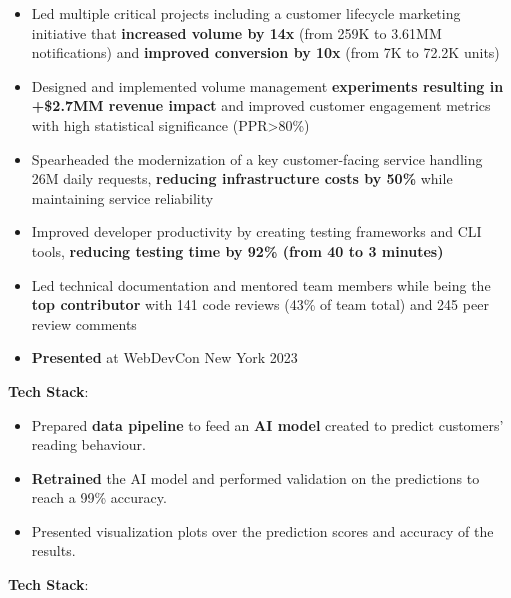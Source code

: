 \documentclass[10pt,a4paper,ragged2e]{altacv}
\begin{document}
\begin{itemize}
  \item Led multiple critical projects including a customer lifecycle marketing initiative that \textbf{increased volume by 14x} (from 259K to 3.61MM notifications) and \textbf{improved conversion by 10x} (from 7K to 72.2K units)
  \item Designed and implemented volume management \textbf{experiments resulting in +\$2.7MM revenue impact} and improved customer engagement metrics with high statistical significance (PPR>80\%)
  \item Spearheaded the modernization of a key customer-facing service handling 26M daily requests, \textbf{reducing infrastructure costs by 50\%} while maintaining service reliability
  \item Improved developer productivity by creating testing frameworks and CLI tools, \textbf{reducing testing time by 92\% (from 40 to 3 minutes)}
  \item Led technical documentation and mentored team members while being the \textbf{top contributor} with 141 code reviews (43\% of team total) and 245 peer review comments
  \item \textbf{Presented} at WebDevCon New York 2023
\end{itemize}

\vspace{2mm}

\textbf{Tech Stack}:

\vspace{4mm}

\begin{itemize}
  \item Prepared \textbf{data pipeline} to feed an \textbf{AI model} created to predict customers' reading behaviour.
  \item \textbf{Retrained} the AI model and performed validation on the predictions to reach a 99\% accuracy.
  \item Presented visualization plots over the prediction scores and accuracy of the results.
\end{itemize}

\textbf{Tech Stack}:

\divider

\medskip

\clearpage

\end{document}
